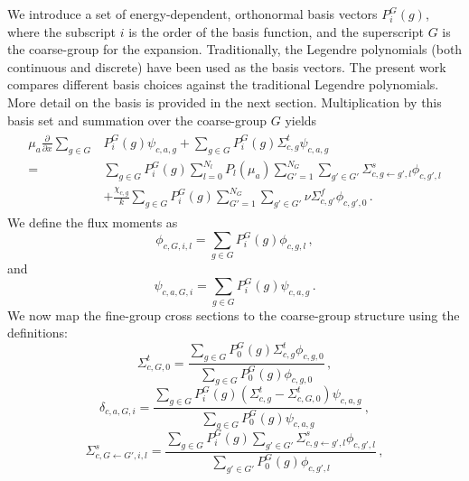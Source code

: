 \documentclass[5p,times,twocolumn,10pt]{elsarticle}
\begin{document}
    We introduce a set of energy-dependent, orthonormal basis vectors $P_i^G(g)$, where the subscript $i$ is the order of the basis function, and the superscript $G$ is the coarse-group for the expansion.
    Traditionally, the Legendre polynomials (both continuous and discrete) have been used as the basis vectors.
    The present work compares different basis choices against the traditional Legendre polynomials.
    More detail on the basis is provided in the next section.
    Multiplication by this basis set and summation over the coarse-group $G$ yields
    \begin{align}
        \begin{split}
            \mu_a\frac{\partial}{\partial x}\sum_{g\in G}&P_i^G(g)\psi_{c,a,g}
            +\sum_{g\in G}P_i^G(g)\Sigma^t_{c, g}\psi_{c,a,g}\\
            =&\sum_{g\in G}P_i^G(g)\sum_{l=0}^{N_l}P_l(\mu_a)\sum_{G'=1}^{N_G}\sum_{g'\in G'}
            \Sigma^s_{c, g\leftarrow g', l}\phi_{c, g', l}\\
            &+\frac{\chi_{c,g}}{k}\sum_{g\in G}P_i^G(g)\sum_{G'=1}^{N_G}\sum_{g'\in G'}\nu\Sigma^f_{c,g'}\phi_{c,g',0}\, .
            \label{eq:do-3}
        \end{split}
    \end{align}
    We define the flux moments as
    \begin{equation}
        \phi_{c,G,i,l}=\sum_{g\in G}P_i^G(g)\phi_{c,g,l}\, ,
        \label{eq:do-4a}
    \end{equation}
    and
    \begin{equation}
        \psi_{c,a,G,i}=\sum_{g\in G}P_i^G(g)\psi_{c,a,g}\, .
        \label{eq:do-4b}
    \end{equation}
    We now map the fine-group cross sections to the coarse-group structure using the definitions:
    \begin{equation}
        \Sigma^t_{c,G,0} = \frac{\sum_{g\in G}P_0^G(g)\Sigma^t_{c,g}\phi_{c,g,0}}
        {\sum_{g\in G}P_0^G(g)\phi_{c,g,0}}\, ,
        \label{eq:do-5}
    \end{equation}
    \begin{equation}
        \delta_{c,a,G,i}
        =\frac{\sum_{g\in G}P_i^G(g)\left(\Sigma^t_{c, g}-\Sigma^t_{c,G,0}\right)\psi_{c,a,g}}
        {\sum_{g\in G}P_0^G(g)\psi_{c,a,g}}\, ,
        \label{eq:do-6}
    \end{equation}
    \begin{equation}
        \Sigma^s_{c,G\leftarrow G',i,l} = \frac{\sum_{g\in G}P_i^G(g)\sum_{g'\in G'}\Sigma^s_{c, g\leftarrow g',l}\phi_{c,g',l}}
        {\sum_{g'\in G'}P_0^G(g)\phi_{c,g',l}}\, ,
        \label{eq:do-7}
    \end{equation}
\end{document}
